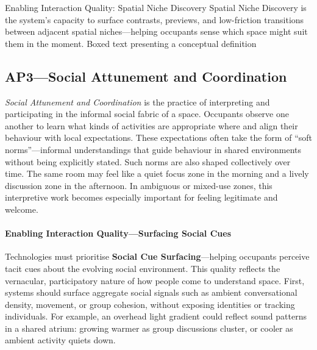 
\designbox
{Enabling Interaction Quality: Spatial Niche Discovery}
{Spatial Niche Discovery is the system’s capacity to surface contrasts, previews, and low-friction transitions between adjacent spatial niches—helping occupants sense which space might suit them in the moment.}
{Boxed text presenting a conceptual definition}


\subsection{AP3---Social Attunement and Coordination}
\textit{Social Attunement and Coordination} is the practice of interpreting and participating in the informal social fabric of a space. Occupants observe one another to learn what kinds of activities are appropriate where and align their behaviour with local expectations. These expectations often take the form of ``soft norms''---informal understandings that guide behaviour in shared environments without being explicitly stated. Such norms are also shaped collectively over time. The same room may feel like a quiet focus zone in the morning and a lively discussion zone in the afternoon. In ambiguous or mixed-use zones, this interpretive work becomes especially important for feeling legitimate and welcome.

\paragraph{Enabling Interaction Quality---Surfacing Social Cues}
Technologies must prioritise \textbf{Social Cue Surfacing}---helping occupants perceive tacit cues about the evolving social environment. This quality reflects the vernacular, participatory nature of how people come to understand space. First, systems should surface aggregate social signals such as ambient conversational density, movement, or group cohesion, without exposing identities or tracking individuals. For example, an overhead light gradient could reflect sound patterns in a shared atrium: growing warmer as group discussions cluster, or cooler as ambient activity quiets down.

